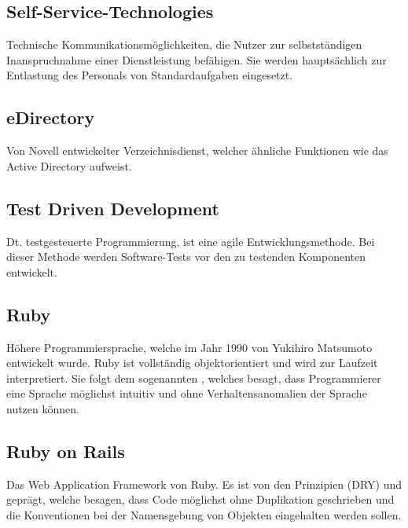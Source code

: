
\subsection*{Self-Service-Technologies}
Technische Kommunikationsmöglichkeiten, die Nutzer zur selbstständigen Inanspruchnahme einer
Dienstleistung befähigen. Sie werden hauptsächlich zur Entlastung des Personals von
Standardaufgaben eingesetzt.
\subsection*{eDirectory}
Von Novell entwickelter Verzeichnisdienst, welcher ähnliche Funktionen wie das Active Directory
aufweist.
\subsection*{Test Driven Development}
Dt. testgesteuerte Programmierung, ist eine agile Entwicklungsmethode. Bei dieser Methode werden
Software-Tests vor den zu testenden Komponenten entwickelt.
\subsection*{Ruby}
Höhere Programmiersprache, welche im Jahr 1990 von Yukihiro Matsumoto entwickelt wurde. Ruby
ist vollständig objektorientiert und wird zur Laufzeit interpretiert. Sie folgt dem sogenannten
, welches besagt, dass Programmierer eine Sprache möglichst
intuitiv und ohne Verhaltensanomalien der Sprache nutzen können.
\subsection*{Ruby on Rails}
Das Web Application Framework von Ruby. Es ist von den Prinzipien  (DRY) und
 geprägt, welche besagen, dass Code möglichst ohne Duplikation
geschrieben und die Konventionen bei der Namensgebung von Objekten eingehalten werden sollen.
